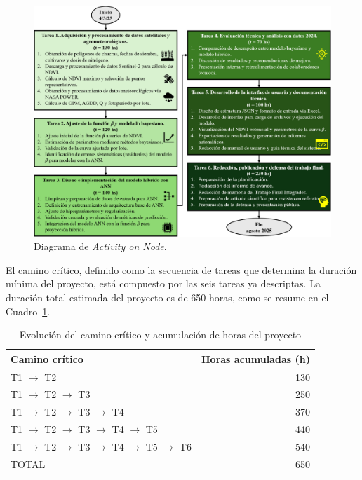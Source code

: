 \documentclass[
11pt, %
]{charter}
\begin{document}
\begin{figure}[htpb]
\centering 
\includegraphics[width=.99
\textwidth]{./Figuras/AoN_ok.png}
\caption{Diagrama de \textit{Activity on Node}.}
\label{fig:AoN}
\end{figure}


El camino crítico, definido como la secuencia de tareas que determina la duración mínima del proyecto, está compuesto por las seis tareas ya descriptas. La duración total estimada del proyecto es de 650 horas, como se resume en el Cuadro~\ref{tab:camino_critico}.

\begin{table}[ht]
\caption{Evolución del camino crítico y acumulación de horas del proyecto}
\label{tab:camino_critico}
\centering
\begin{tabular}{|l|r|}
\hline
\rowcolor[HTML]{C0C0C0}
\textbf{Camino crítico} & \textbf{Horas acumuladas (h)} \\ \hline
T1 $\rightarrow$ T2                                   & 130 \\ \hline
T1 $\rightarrow$ T2 $\rightarrow$ T3                  & 250 \\ \hline
T1 $\rightarrow$ T2 $\rightarrow$ T3 $\rightarrow$ T4 & 370 \\ \hline
T1 $\rightarrow$ T2 $\rightarrow$ T3 $\rightarrow$ T4 $\rightarrow$ T5 & 440 \\ \hline
T1 $\rightarrow$ T2 $\rightarrow$ T3 $\rightarrow$ T4 $\rightarrow$ T5 $\rightarrow$ T6 & 540 \\ \hline
\rowcolor[HTML]{C0C0C0}
TOTAL                                                & 650 \\ \hline
\end{tabular}
\end{table}
\end{document}
